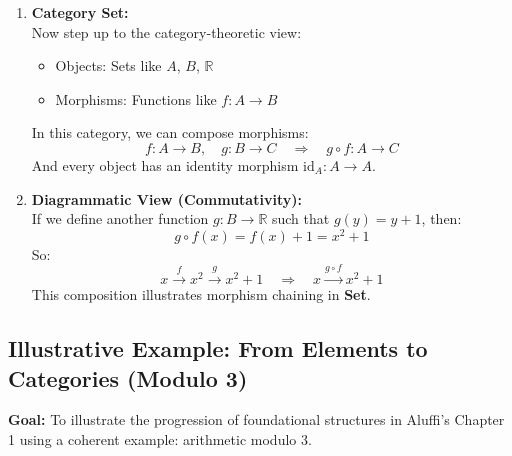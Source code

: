 \documentclass[10pt]{article}
\theoremstyle{plain}
\theoremstyle{definition}
\begin{document}
\begin{enumerate}
  	\item \textbf{Category \textbf{Set}:} \\
  	Now step up to the category-theoretic view:
  	\begin{itemize}
  		\item Objects: Sets like \( A \), \( B \), \( \mathbb{R} \)
  		\item Morphisms: Functions like \( f : A \to B \)
  	\end{itemize}
  	In this category, we can compose morphisms:
  	\[
  	f : A \to B, \quad g : B \to C \quad \Rightarrow \quad g \circ f : A \to C
  	\]
  	And every object has an identity morphism \( \text{id}_A : A \to A \).
  	
  	\item \textbf{Diagrammatic View (Commutativity):} \\
  	If we define another function \( g : B \to \mathbb{R} \) such that \( g(y) = y + 1 \), then:
  	\[
  	g \circ f(x) = f(x) + 1 = x^2 + 1
  	\]
  	So:
  	\[
  	x \xrightarrow{f} x^2 \xrightarrow{g} x^2 + 1
  	\quad \Rightarrow \quad
  	x \xrightarrow{g \circ f} x^2 + 1
  	\]
  	This composition illustrates morphism chaining in \textbf{Set}.
  \end{enumerate}
  
  
  \subsection*{Illustrative Example: From Elements to Categories (Modulo 3)}
  
  \textbf{Goal:} To illustrate the progression of foundational structures in Aluffi's Chapter 1 using a coherent example: arithmetic modulo 3.
  
\end{document}
